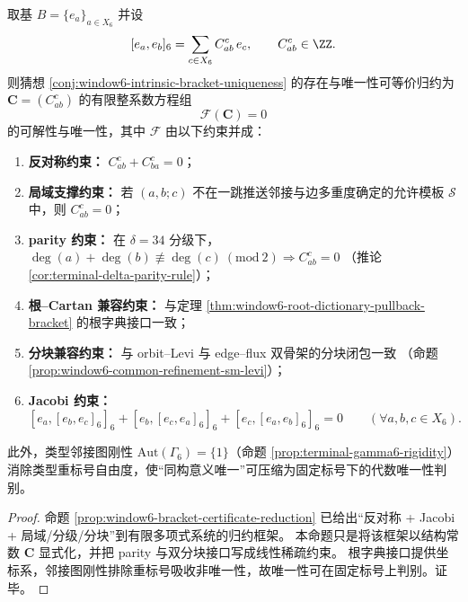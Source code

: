 \begin{proposition}[内禀括号存在唯一性的有限整数系统归约]\label{prop:window6-intrinsic-bracket-finite-integer-reduction}
取基 \(B=\{e_a\}_{a\in X_6}\) 并设
\[
[e_a,e_b]_6=\sum_{c\in X_6}C_{ab}^{c}\,e_c,\qquad C_{ab}^{c}\in\ZZ.
\]
则猜想 \ref{conj:window6-intrinsic-bracket-uniqueness} 的存在与唯一性可等价归约为
\(\mathbf C=(C_{ab}^{c})\) 的有限整系数方程组
\[
\mathcal F(\mathbf C)=0
\]
的可解性与唯一性，其中 \(\mathcal F\) 由以下约束并成：
\begin{enumerate}
  \item \textbf{反对称约束：}
  \(
  C_{ab}^{c}+C_{ba}^{c}=0
  \)；
  \item \textbf{局域支撑约束：}
  若 \((a,b;c)\) 不在一跳推送邻接与边多重度确定的允许模板 \(\mathcal S\) 中，则
  \(
  C_{ab}^{c}=0
  \)；
  \item \textbf{parity 约束：}
  在 \(\delta=34\) 分级下，
  \(
  \deg(a)+\deg(b)\not\equiv \deg(c)\ (\mathrm{mod}\ 2)
  \Rightarrow C_{ab}^{c}=0
  \)
  （推论 \ref{cor:terminal-delta-parity-rule}）；
  \item \textbf{根--Cartan 兼容约束：}
  与定理 \ref{thm:window6-root-dictionary-pullback-bracket} 的根字典接口一致；
  \item \textbf{分块兼容约束：}
  与 orbit--Levi 与 edge--flux 双骨架的分块闭包一致
  （命题 \ref{prop:window6-common-refinement-sm-levi}）；
  \item \textbf{Jacobi 约束：}
  \[
  [e_a,[e_b,e_c]_6]_6+[e_b,[e_c,e_a]_6]_6+[e_c,[e_a,e_b]_6]_6=0
  \qquad (\forall a,b,c\in X_6).
  \]
\end{enumerate}
此外，类型邻接图刚性 \(\mathrm{Aut}(\Gamma_6)=\{1\}\)（命题 \ref{prop:terminal-gamma6-rigidity}）
消除类型重标号自由度，使“同构意义唯一”可压缩为固定标号下的代数唯一性判别。
\end{proposition}
\begin{proof}
命题 \ref{prop:window6-bracket-certificate-reduction} 已给出“反对称 + Jacobi + 局域/分级/分块”到有限多项式系统的归约框架。
本命题只是将该框架以结构常数 \(\mathbf C\) 显式化，并把 parity 与双分块接口写成线性稀疏约束。
根字典接口提供坐标系，邻接图刚性排除重标号吸收非唯一性，故唯一性可在固定标号上判别。证毕。
\end{proof}

